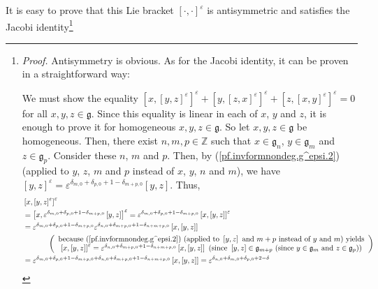 \documentclass[etingof-lie.tex]{subfiles}
\begin{document}
It is easy to prove that this Lie bracket $\left[  \cdot,\cdot\right]
^{\varepsilon}$ is antisymmetric and satisfies the Jacobi
identity\footnote{\textit{Proof.} Antisymmetry is obvious. As for the Jacobi
identity, it can be proven in a straightforward way:
\par
We must show the equality $\left[  x,\left[  y,z\right]  ^{\varepsilon
}\right]  ^{\varepsilon}+\left[  y,\left[  z,x\right]  ^{\varepsilon}\right]
^{\varepsilon}+\left[  z,\left[  x,y\right]  ^{\varepsilon}\right]
^{\varepsilon}=0$ for all $x,y,z\in\mathfrak{g}$. Since this equality is
linear in each of $x$, $y$ and $z$, it is enough to prove it for homogeneous
$x,y,z\in\mathfrak{g}$. So let $x,y,z\in\mathfrak{g}$ be homogeneous. Then,
there exist $n,m,p\in\mathbb{Z}$ such that $x\in\mathfrak{g}_{n}$,
$y\in\mathfrak{g}_{m}$ and $z\in\mathfrak{g}_{p}$. Consider these $n$, $m$ and
$p$. Then, by (\ref{pf.invformnondeg.g^epsi.2}) (applied to $y$, $z$, $m$ and
$p$ instead of $x$, $y$, $n$ and $m$), we have $\left[  y,z\right]
^{\varepsilon}=\varepsilon^{\delta_{m,0}+\delta_{p,0}+1-\delta_{m+p,0}}\left[
y,z\right]  $. Thus,%
\begin{align*}
&  \left[  x,\left[  y,z\right]  ^{\varepsilon}\right]  ^{\varepsilon}\\
&  =\left[  x,\varepsilon^{\delta_{m,0}+\delta_{p,0}+1-\delta_{m+p,0}}\left[
y,z\right]  \right]  ^{\varepsilon}=\varepsilon^{\delta_{m,0}+\delta
_{p,0}+1-\delta_{m+p,0}}\left[  x,\left[  y,z\right]  \right]  ^{\varepsilon
}\\
&  =\varepsilon^{\delta_{m,0}+\delta_{p,0}+1-\delta_{m+p,0}}\varepsilon
^{\delta_{n,0}+\delta_{m+p,0}+1-\delta_{n+m+p,0}}\left[  x,\left[  y,z\right]
\right] \\
&  \ \ \ \ \ \ \ \ \ \ \left(
\begin{array}
[c]{c}%
\text{because (\ref{pf.invformnondeg.g^epsi.2}) (applied to }\left[
y,z\right]  \text{ and }m+p\text{ instead of }y\text{ and }m\text{) yields}\\
\left[  x,\left[  y,z\right]  \right]  ^{\varepsilon}=\varepsilon
^{\delta_{n,0}+\delta_{m+p,0}+1-\delta_{n+m+p,0}}\left[  x,\left[  y,z\right]
\right]  \text{ (since }\left[  y,z\right]  \in\mathfrak{g}_{m+p}\text{ (since
}y\in\mathfrak{g}_{m}\text{ and }z\in\mathfrak{g}_{p}\text{))}%
\end{array}
\right) \\
&  =\varepsilon^{\delta_{m,0}+\delta_{p,0}+1-\delta_{m+p,0}+\delta
_{n,0}+\delta_{m+p,0}+1-\delta_{n+m+p,0}}\left[  x,\left[  y,z\right]
\right]  =\varepsilon^{\delta_{n,0}+\delta_{m,0}+\delta_{p,0}+2-\delta
}
\end{align*}}
\end{document}
